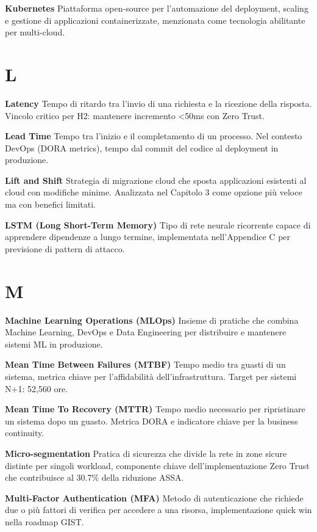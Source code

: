 \documentclass[12pt,a4paper,oneside]{book}
\numberwithin{figure}{chapter} %
\numberwithin{table}{chapter}  %
\begin{document}
\textbf{Kubernetes} Piattaforma open-source per l'automazione del
deployment, scaling e gestione di applicazioni containerizzate,
menzionata come tecnologia abilitante per multi-cloud.

\section{L}\label{l}

\textbf{Latency} Tempo di ritardo tra l'invio di una richiesta e la
ricezione della risposta. Vincolo critico per H2: mantenere incremento
\textless50ms con Zero Trust.

\textbf{Lead Time} Tempo tra l'inizio e il completamento di un processo.
Nel contesto DevOps (DORA metrics), tempo dal commit del codice al
deployment in produzione.

\textbf{Lift and Shift} Strategia di migrazione cloud che sposta
applicazioni esistenti al cloud con modifiche minime. Analizzata nel
Capitolo 3 come opzione più veloce ma con benefici limitati.

\textbf{LSTM (Long Short-Term Memory)} Tipo di rete neurale ricorrente
capace di apprendere dipendenze a lungo termine, implementata
nell'Appendice C per previsione di pattern di attacco.

\section{M}\label{m}

\textbf{Machine Learning Operations (MLOps)} Insieme di pratiche che
combina Machine Learning, DevOps e Data Engineering per distribuire e
mantenere sistemi ML in produzione.

\textbf{Mean Time Between Failures (MTBF)} Tempo medio tra guasti di un
sistema, metrica chiave per l'affidabilità dell'infrastruttura. Target
per sistemi N+1: 52,560 ore.

\textbf{Mean Time To Recovery (MTTR)} Tempo medio necessario per
ripristinare un sistema dopo un guasto. Metrica DORA e indicatore chiave
per la business continuity.

\textbf{Micro-segmentation} Pratica di sicurezza che divide la rete in
zone sicure distinte per singoli workload, componente chiave
dell'implementazione Zero Trust che contribuisce al 30.7\% della
riduzione ASSA.

\textbf{Multi-Factor Authentication (MFA)} Metodo di autenticazione che
richiede due o più fattori di verifica per accedere a una risorsa,
implementazione quick win nella roadmap GIST.
\end{document}
